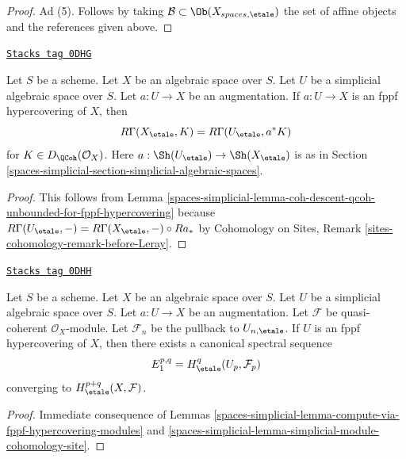\begin{proof}
\medskip\noindent
Ad (5). Follows by taking $\mathcal{B} \subset \Ob(X_{spaces, \etale})$
the set of affine objects and the references given above.
\end{proof}

\begin{lemma}
\label{spaces-simplicial-lemma-compute-via-fppf-hypercovering-modules}
\href{https://stacks.math.columbia.edu/tag/0DHG}{\texttt{Stacks tag 0DHG}}

Let $S$ be a scheme. Let $X$ be an algebraic space over $S$.
Let $U$ be a simplicial algebraic space over $S$. Let $a : U \to X$
be an augmentation. If $a : U \to X$ is an fppf hypercovering of $X$, then
$$
R\Gamma(X_\etale, K) = R\Gamma(U_\etale, a^*K)
$$
for $K \in D_\QCoh(\mathcal{O}_X)$. Here $a : \Sh(U_\etale) \to \Sh(X_\etale)$
is as in Section \ref{spaces-simplicial-section-simplicial-algebraic-spaces}.
\end{lemma}

\begin{proof}
This follows from
Lemma \ref{spaces-simplicial-lemma-coh-descent-qcoh-unbounded-for-fppf-hypercovering}
because $R\Gamma(U_\etale, -) = R\Gamma(X_\etale, -) \circ Ra_*$ by
Cohomology on Sites, Remark \ref{sites-cohomology-remark-before-Leray}.
\end{proof}

\begin{lemma}
\label{spaces-simplicial-lemma-spectral-sequence-fppf-hypercovering-modules}
\href{https://stacks.math.columbia.edu/tag/0DHH}{\texttt{Stacks tag 0DHH}}

Let $S$ be a scheme. Let $X$ be an algebraic space over $S$.
Let $U$ be a simplicial algebraic space over $S$. Let $a : U \to X$
be an augmentation. Let $\mathcal{F}$ be quasi-coherent
$\mathcal{O}_X$-module. Let $\mathcal{F}_n$ be the pullback to
$U_{n, \etale}$. If $U$ is an fppf hypercovering of $X$, then
there exists a canonical spectral sequence
$$
E_1^{p, q} = H^q_\etale(U_p, \mathcal{F}_p)
$$
converging to $H^{p + q}_\etale(X, \mathcal{F})$.
\end{lemma}

\begin{proof}
Immediate consequence of
Lemmas \ref{spaces-simplicial-lemma-compute-via-fppf-hypercovering-modules}
and \ref{spaces-simplicial-lemma-simplicial-module-cohomology-site}.
\end{proof}

